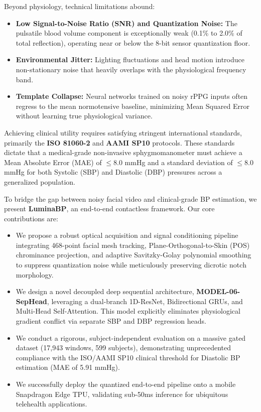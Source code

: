 Beyond physiology, technical limitations abound:
\begin{itemize}
    \item \textbf{Low Signal-to-Noise Ratio (SNR) and Quantization Noise:} The pulsatile blood volume component is exceptionally weak (0.1\% to 2.0\% of total reflection), operating near or below the 8-bit sensor quantization floor.
    \item \textbf{Environmental Jitter:} Lighting fluctuations and head motion introduce non-stationary noise that heavily overlaps with the physiological frequency band.
    \item \textbf{Template Collapse:} Neural networks trained on noisy rPPG inputs often regress to the mean normotensive baseline, minimizing Mean Squared Error without learning true physiological variance.
\end{itemize}

Achieving clinical utility requires satisfying stringent international standards, primarily the \textbf{ISO 81060-2} and \textbf{AAMI SP10} protocols. These standards dictate that a medical-grade non-invasive sphygmomanometer must achieve a Mean Absolute Error (MAE) of $\le 8.0$ mmHg and a standard deviation of $\le 8.0$ mmHg for both Systolic (SBP) and Diastolic (DBP) pressures across a generalized population. 

To bridge the gap between noisy facial video and clinical-grade BP estimation, we present \textbf{LuminaBP}, an end-to-end contactless framework. Our core contributions are:
\begin{itemize}
    \item We propose a robust optical acquisition and signal conditioning pipeline integrating 468-point facial mesh tracking, Plane-Orthogonal-to-Skin (POS) chrominance projection, and adaptive Savitzky-Golay polynomial smoothing to suppress quantization noise while meticulously preserving dicrotic notch morphology.
    \item We design a novel decoupled deep sequential architecture, \textbf{MODEL-06-SepHead}, leveraging a dual-branch 1D-ResNet, Bidirectional GRUs, and Multi-Head Self-Attention. This model explicitly eliminates physiological gradient conflict via separate SBP and DBP regression heads.
    \item We conduct a rigorous, subject-independent evaluation on a massive gated dataset (17,943 windows, 599 subjects), demonstrating unprecedented compliance with the ISO/AAMI SP10 clinical threshold for Diastolic BP estimation (MAE of 5.91 mmHg).
    \item We successfully deploy the quantized end-to-end pipeline onto a mobile Snapdragon Edge TPU, validating sub-50ms inference for ubiquitous telehealth applications.
\end{itemize}
